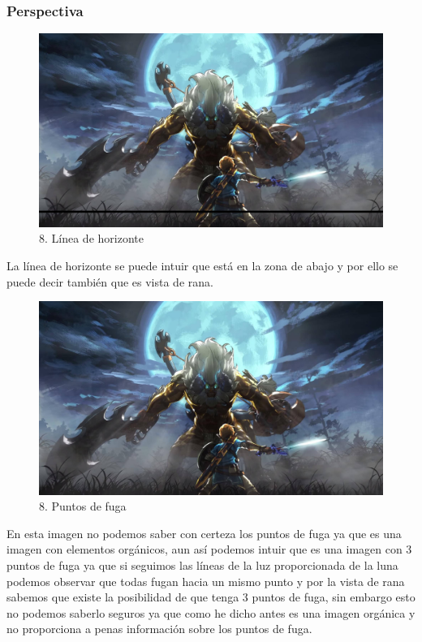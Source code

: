 \documentclass[12pt]{article}
\begin{document}
        \subsubsection{Perspectiva}

\begin{figure}[H]
      \centering
      \includegraphics[scale=0.25]{images/Raúl/Sección 8/Imagen 8 horizonte.jpg}
      \caption{\small 8. Línea de horizonte}
    \end{figure}

La línea de horizonte se puede intuir que está en la zona de abajo y por ello se puede decir también que es vista de rana.

\begin{figure}[H]
      \centering
      \includegraphics[scale=0.25]{images/Concepts/8_concept_art}
      \caption{\small 8. Puntos de fuga}
    \end{figure}
    
En esta imagen no podemos saber con certeza los puntos de fuga ya que es una imagen con elementos orgánicos, aun así podemos intuir que es una imagen con 3 puntos de fuga ya que si seguimos las líneas de la luz proporcionada de la luna podemos observar que todas fugan hacia un mismo punto y por la vista de rana sabemos que existe la posibilidad de que tenga 3 puntos de fuga, sin embargo esto no podemos saberlo seguros ya que como he dicho antes es una imagen orgánica y no proporciona a penas información sobre los puntos de fuga.
\end{document}

